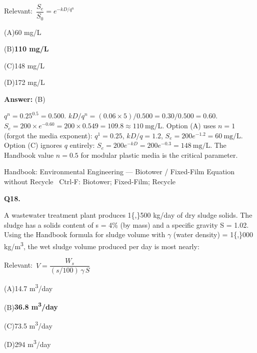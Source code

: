 \documentclass[11pt]{article}
\newcommand{\correct}[1]{\textbf{#1}\;{\color{accent}$\checkmark$}}
\newcommand{\optline}[2]{\par\noindent\hspace{1.2em}(#1)\hspace{0.6em}#2}
\begin{document}
{\small\color{soft}Relevant:}\ $\dfrac{S_e}{S_0} = e^{-kD/q^n}$\par\vspace{3pt}
\optline{A}{60 mg/L}
\optline{B}{\correct{110 mg/L}}
\optline{C}{148 mg/L}
\optline{D}{172 mg/L}
\par\vspace{3pt}
\vspace{2pt}\par\noindent\colorbox{boxbg}{\parbox{\dimexpr\linewidth-2\fboxsep\relax}{%
\vspace{2pt}\textbf{Answer:} (B)\par\vspace{2pt}
{\small $q^n = 0.25^{0.5} = 0.500$.  $kD/q^n = (0.06\times5)/0.500 = 0.30/0.500 = 0.60$.  $S_e = 200\times e^{-0.60} = 200\times0.549 = 109.8\approx110\ \mathrm{mg/L}$. Option (A) uses $n=1$ (forgot the media exponent): $q^1 = 0.25$, $kD/q = 1.2$, $S_e = 200e^{-1.2} = 60\ \mathrm{mg/L}$. Option (C) ignores $q$ entirely: $S_e = 200e^{-kD} = 200e^{-0.3} = 148\ \mathrm{mg/L}$. The Handbook value $n = 0.5$ for modular plastic media is the critical parameter.}\par\vspace{2pt}
{\footnotesize\color{soft}Handbook: Environmental Engineering --- Biotower / Fixed-Film Equation without Recycle \textbullet\ Ctrl-F: Biotower; Fixed-Film; Recycle}\vspace{2pt}
}}
\vspace{9pt}
\filbreak
\textbf{\color{accent}Q18.}\par\vspace{2pt}
A wastewater treatment plant produces 1\{,\}500 kg/day of dry sludge solids. The sludge has a solids content of s = 4\% (by mass) and a specific gravity S = 1.02. Using the Handbook formula for sludge volume with $\gamma$ (water density) = 1\{,\}000 kg/m\textsuperscript{3}, the wet sludge volume produced per day is most nearly:\par\vspace{3pt}
{\small\color{soft}Relevant:}\ $V = \dfrac{W_s}{(s/100)\,\gamma\,S}$\par\vspace{3pt}
\optline{A}{14.7 m\textsuperscript{3}/day}
\optline{B}{\correct{36.8 m\textsuperscript{3}/day}}
\optline{C}{73.5 m\textsuperscript{3}/day}
\optline{D}{294 m\textsuperscript{3}/day}
\par\vspace{3pt}
\end{document}
